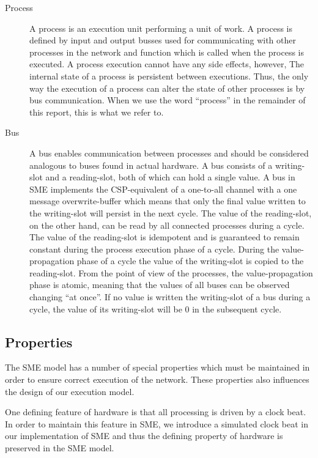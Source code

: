 \begin{description}
\item[Process] A process is an execution unit performing a unit of
  work. A process is defined by input and output busses used for
  communicating with other processes in the network and function which
  is called when the process is executed. A process execution cannot
  have any side effects, however, The internal state of a process is
  persistent between executions.  Thus, the only way the execution of
  a process can alter the state of other processes is by bus
  communication. When we use the word "`process"' in the remainder of
  this report, this is what we refer to.

\item[Bus] A bus enables communication between processes and should be
  considered analogous to buses found in actual hardware. A bus
  consists of a writing-slot and a reading-slot, both of which can
  hold a single value. A bus in SME implements the
  CSP-equivalent of a one-to-all channel with a one message
  overwrite-buffer which means that only the final value written to
  the writing-slot will persist in the next cycle. The value of the
  reading-slot, on the other hand, can be read by all connected
  processes during a cycle. The value of the reading-slot is
  idempotent and is guaranteed to remain constant during the process
  execution phase of a cycle. During the value-propagation phase of a
  cycle the value of the writing-slot is copied to the
  reading-slot. From the point of view of the processes, the
  value-propagation phase is atomic, meaning that the values of all
  buses can be observed changing ``at once''. If no value is written
  the writing-slot of a bus during a cycle, the value of its
  writing-slot will be 0 in the subsequent cycle.

\end{description}

\subsection{Properties}
The SME model has a number of special properties which must be
maintained in order to ensure correct execution of the network. These
properties also influences the design of our execution model.

\begin{property} One defining feature of
    hardware is that all processing is driven by a clock beat. In
    order to maintain this feature in SME, we introduce a simulated
    clock beat in our implementation of SME and thus the defining
    property of hardware is preserved in the SME model.
\end{property}

